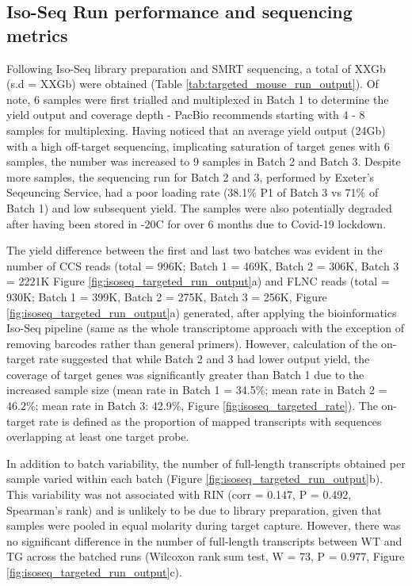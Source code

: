 \subsection{Iso-Seq Run performance and sequencing metrics}
Following Iso-Seq library preparation and SMRT sequencing, a total of XXGb (s.d = XXGb) were obtained (Table \ref{tab:targeted_mouse_run_output}). Of note, 6 samples were first trialled and multiplexed in Batch 1 to determine the yield output and coverage depth - PacBio recommends starting with 4 - 8 samples for multiplexing. Having noticed that an average yield output (24Gb) with a high off-target sequencing, implicating saturation of target genes with 6 samples, the number was increased to 9 samples in Batch 2 and Batch 3. Despite more samples, the sequencing run for Batch 2 and 3, performed by Exeter's Seqeuncing Service, had a poor loading rate (38.1\% P1 of Batch 3 vs 71\% of Batch 1) and low subsequent yield. The samples were also potentially degraded after having been stored in -20\textdegree C for over 6 months due to Covid-19 lockdown. 

The yield difference between the first and last two batches was evident in the number of CCS reads (total = 996K; Batch 1 = 469K, Batch 2 = 306K, Batch 3 = 2221K Figure \ref{fig:isoseq_targeted_run_output}a) and FLNC reads (total = 930K; Batch 1 = 399K, Batch 2 = 275K, Batch 3 = 256K, Figure \ref{fig:isoseq_targeted_run_output}a) generated, after applying the bioinformatics Iso-Seq pipeline (same as the whole transcriptome approach with the exception of removing barcodes rather than general primers). However, calculation of the on-target rate suggested that while Batch 2 and 3 had lower output yield, the coverage of target genes was significantly greater than Batch 1 due to the increased sample size (mean rate in Batch 1 = 34.5\%; mean rate in Batch 2 = 46.2\%; mean rate in Batch 3: 42.9\%, Figure \ref{fig:isoseq_targeted_rate}). The on-target rate is defined as the proportion of mapped transcripts with sequences overlapping at least one target probe. 

In addition to batch variability, the number of full-length transcripts obtained per sample varied within each batch (Figure \ref{fig:isoseq_targeted_run_output}b). This variability was not associated with RIN (corr = 0.147, P = 0.492, Spearman's rank) and is unlikely to be due to library preparation, given that samples were pooled in equal molarity during target capture. However, there was no significant difference in the number of full-length transcripts between WT and TG across the batched runs (Wilcoxon rank sum test, W = 73, P = 0.977, Figure \ref{fig:isoseq_targeted_run_output}c). 


